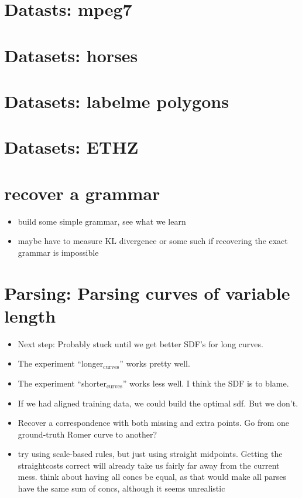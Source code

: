 \documentclass{book}
\begin{document}
\section{Datasts: mpeg7}
\label{sec-6_6}
\section{Datasets: horses}
\label{sec-6_7}
\section{Datasets: labelme polygons}
\label{sec-6_8}
\section{Datasets: ETHZ}
\label{sec-6_9}
\section{recover a grammar}
\label{sec-6_10}

\begin{itemize}
\item build some simple grammar, see what we learn
\item maybe have to measure KL divergence or some such if recovering the
    exact grammar is impossible
\end{itemize}
\section{Parsing: Parsing curves of variable length}
\label{sec-6_11}

\begin{itemize}
\item Next step: Probably stuck until we get better SDF's for long curves.
\item The experiment ``longer$_{\mathrm{curves}}$'' works pretty well.
\item The experiment ``shorter$_{\mathrm{curves}}$'' works less well.  I think the SDF
    is to blame.
\item If we had aligned training data, we could build the optimal
    sdf. But we don't.
\item Recover a correspondence with both missing and extra points. Go
    from one ground-truth Romer curve to another?
\item try using scale-based rules, but just using straight
    midpoints. Getting the straightcosts correct will already take us
    fairly far away from the current mess. think about having all
    concs be equal, as that would make all parses have the same sum of
    concs, although it seems unrealistic
\end{itemize}
\end{document}
